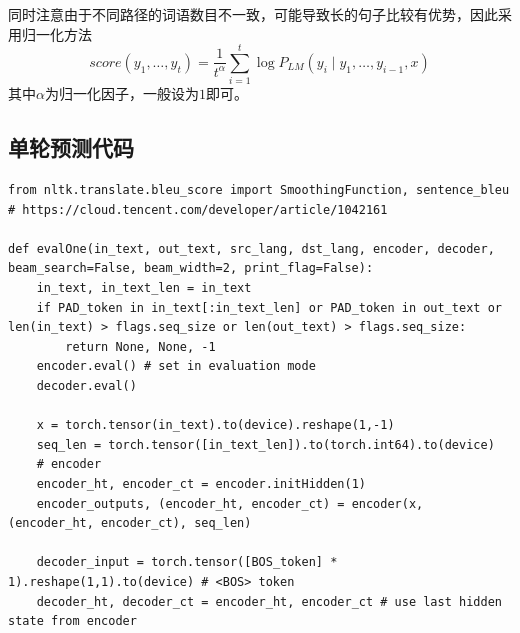 \documentclass[logo,reportComp]{thesis}
\begin{document}
同时注意由于不同路径的词语数目不一致，可能导致长的句子比较有优势，因此采用归一化方法
\[score(y_1,\ldots,y_t)=\frac{1}{t^\alpha}\sum_{i=1}^t\log P_{LM}(y_i\mid y_1,\ldots,y_{i-1},x)\]
其中$\alpha$为归一化因子，一般设为$1$即可。

\subsection{单轮预测代码}
\begin{lstlisting}
from nltk.translate.bleu_score import SmoothingFunction, sentence_bleu
# https://cloud.tencent.com/developer/article/1042161

def evalOne(in_text, out_text, src_lang, dst_lang, encoder, decoder, beam_search=False, beam_width=2, print_flag=False):
    in_text, in_text_len = in_text
    if PAD_token in in_text[:in_text_len] or PAD_token in out_text or len(in_text) > flags.seq_size or len(out_text) > flags.seq_size:
        return None, None, -1
    encoder.eval() # set in evaluation mode
    decoder.eval()

    x = torch.tensor(in_text).to(device).reshape(1,-1)
    seq_len = torch.tensor([in_text_len]).to(torch.int64).to(device)
    # encoder
    encoder_ht, encoder_ct = encoder.initHidden(1)
    encoder_outputs, (encoder_ht, encoder_ct) = encoder(x, (encoder_ht, encoder_ct), seq_len)

    decoder_input = torch.tensor([BOS_token] * 1).reshape(1,1).to(device) # <BOS> token
    decoder_ht, decoder_ct = encoder_ht, encoder_ct # use last hidden state from encoder


\end{lstlisting}
\end{document}
